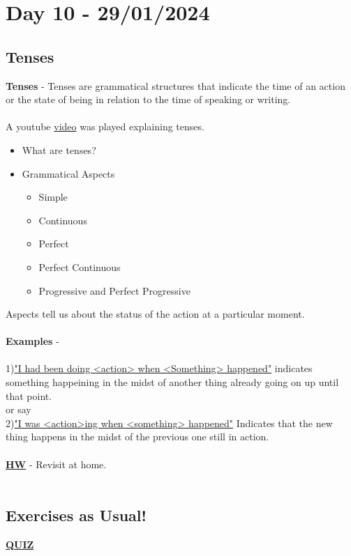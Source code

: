\documentclass[a4paper,30pt]{report}
\begin{document}
  \chapter{Day 10 - 29/01/2024} %
  \label{chap:Day 10 - 29/01/2024}
    \section{Tenses} %
      \textbf{Tenses} - Tenses are grammatical structures that indicate the time of an action or the state of being in relation to the time of speaking or writing.\\\\
      A youtube \href{https://www.youtube.com/watch?v=54prMaPn5Ls&authuser=1}{video} was played explaining tenses. 
      \begin{itemize}
        \item What are tenses?
        \item Grammatical Aspects \begin{itemize}
            \item Simple
            \item Continuous
            \item Perfect
            \item Perfect Continuous
            \item Progressive and Perfect Progressive
          \end{itemize}
      \end{itemize}
      Aspects tell us about the status of the action at a particular moment.\\\\
      \textbf{Examples} -\\\\
      1)\underline{"I had been doing <action> when <Something> happened"} indicates something happeining in the midst of another thing already going on up until that point.\\
      or say\\
      2)\underline{"I was <action>ing when <something> happened"} Indicates that the new thing happens in the midst of the previous one still in action.\\\\
      \underline{\textbf{HW}} - Revisit at home.\\\\
    
    \section{Exercises as Usual!}
      \href{https://www.english-grammar.at/online_exercises/tenses/tenses_index.htm}{\textbf{QUIZ}}
  
\end{document}
